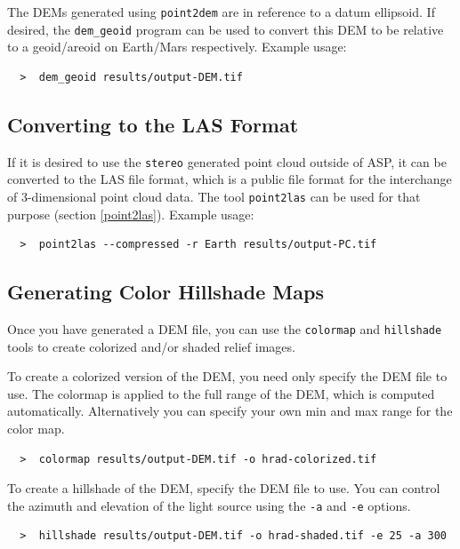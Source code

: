 The DEMs generated using \texttt{point2dem} are in reference to a datum
ellipsoid. If desired, the \texttt{dem\_geoid} program can be used to
convert this DEM to be relative to a geoid/areoid on Earth/Mars
respectively. Example usage:

\begin {verbatim}
  >  dem_geoid results/output-DEM.tif
\end{verbatim}

\subsection{Converting to the LAS Format}

If it is desired to use the \texttt{stereo} generated point cloud
outside of ASP, it can be converted to the LAS file format, which is a public file
format for the interchange of 3-dimensional point cloud data. The tool
\texttt{point2las} can be used for that purpose (section
\ref{point2las}). Example usage:

\begin {verbatim}
  >  point2las --compressed -r Earth results/output-PC.tif
\end{verbatim}

\subsection{Generating Color Hillshade Maps}
\label{genhillshade}

Once you have generated a \ac{DEM} file, you can use the
\texttt{colormap} and \texttt{hillshade} tools to create colorized
and/or shaded relief images.

To create a colorized version of the \ac{DEM}, you need only specify
the \ac{DEM} file to use. The colormap is applied to the full range of
the DEM, which is computed automatically.  Alternatively you can
specify your own min and max range for the color map.

\begin{verbatim}
  >  colormap results/output-DEM.tif -o hrad-colorized.tif
\end{verbatim}

To create a hillshade of the \ac{DEM}, specify the \ac{DEM} file to
use. You can control the azimuth and elevation of the light source
using the \texttt{-a} and \texttt{-e} options.

\begin{verbatim}
  >  hillshade results/output-DEM.tif -o hrad-shaded.tif -e 25 -a 300
\end{verbatim}

